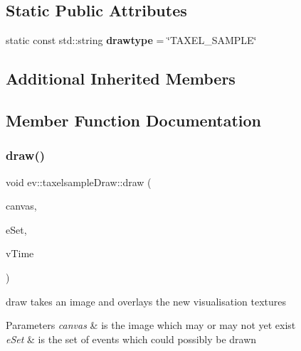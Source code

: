 \subsection*{Static Public Attributes}
\begin{DoxyCompactItemize}
\item 
\mbox{\label{classev_1_1taxelsampleDraw_a461de248c8eee82c8f2a88a24a919992}} 
static const std\+::string {\bfseries drawtype} = \char`\"{}T\+A\+X\+E\+L\+\_\+\+S\+A\+M\+P\+LE\char`\"{}
\end{DoxyCompactItemize}
\subsection*{Additional Inherited Members}


\subsection{Member Function Documentation}
\mbox{\label{classev_1_1taxelsampleDraw_a43e40e8cfc4ed342f8d616eb9ddecf0a}} 
\subsubsection{\texorpdfstring{draw()}{draw()}}
{\footnotesize\ttfamily void ev\+::taxelsample\+Draw\+::draw (\begin{DoxyParamCaption}\item[{cv\+::\+Mat \&}]{canvas,  }\item[{const ev\+::v\+Queue \&}]{e\+Set,  }\item[{int}]{v\+Time }\end{DoxyParamCaption})\hspace{0.3cm}{\ttfamily [virtual]}}



draw takes an image and overlays the new visualisation textures 


\begin{DoxyParams}{Parameters}
{\em canvas} & is the image which may or may not yet exist \\
\hline
{\em e\+Set} & is the set of events which could possibly be drawn \\
\hline
\end{DoxyParams}


